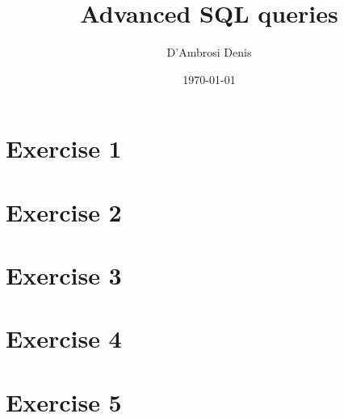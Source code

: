 \documentclass{article}
\title{Advanced SQL queries}
\author{D'Ambrosi Denis}
\date{\today} %
\begin{document}
\maketitle
\clearpage

\section*{Exercise 1}

\clearpage

\section*{Exercise 2}

\clearpage

\section*{Exercise 3}

\clearpage

\section*{Exercise 4}

\clearpage

\section*{Exercise 5}

\end{document}
